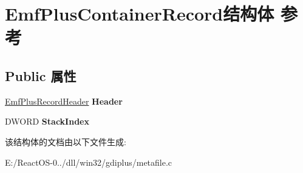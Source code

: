 \hypertarget{struct_emf_plus_container_record}{}\section{Emf\+Plus\+Container\+Record结构体 参考}
\label{struct_emf_plus_container_record}
\subsection*{Public 属性}
\begin{DoxyCompactItemize}
\item 
\mbox{\label{struct_emf_plus_container_record_abffde125ca40c4b77a344ed6e44f7c98}} 
\hyperlink{struct_emf_plus_record_header}{Emf\+Plus\+Record\+Header} {\bfseries Header}
\item 
\mbox{\label{struct_emf_plus_container_record_a14d39038bfe834701034fb357de53e56}} 
D\+W\+O\+RD {\bfseries Stack\+Index}
\end{DoxyCompactItemize}


该结构体的文档由以下文件生成\+:\begin{DoxyCompactItemize}
\item 
E\+:/\+React\+O\+S-\/0../dll/win32/gdiplus/metafile.\+c\end{DoxyCompactItemize}
